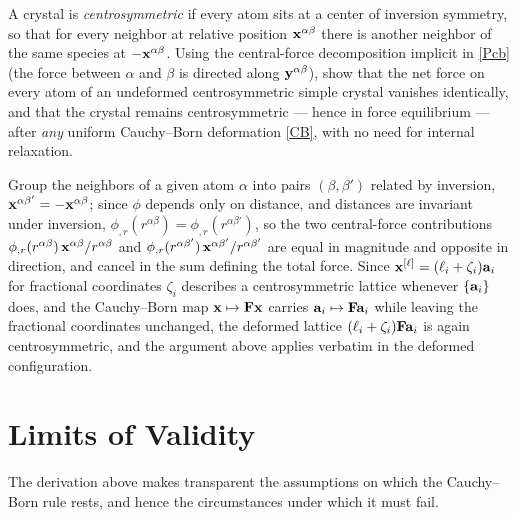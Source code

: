 \begin{exercise}\label{ex:centrosym}
	A crystal is \textit{centrosymmetric} if every atom sits at a center of inversion symmetry, so that for every neighbor at relative position $\mathbf{x}^{\alpha\beta}$ there is another neighbor of the same species at $-\mathbf{x}^{\alpha\beta}$. Using the central-force decomposition implicit in \eqref{Pcb} (the force between $\alpha$ and $\beta$ is directed along $\mathbf{y}^{\alpha\beta}$), show that the net force on every atom of an undeformed centrosymmetric simple crystal vanishes identically, and that the crystal remains centrosymmetric --- hence in force equilibrium --- after \textit{any} uniform Cauchy--Born deformation \eqref{CB}, with no need for internal relaxation.
	\begin{svolgimento}
		Group the neighbors of a given atom $\alpha$ into pairs $(\beta,\beta')$ related by inversion, $\mathbf{x}^{\alpha\beta'}=-\mathbf{x}^{\alpha\beta}$; since $\phi$ depends only on distance, and distances are invariant under inversion, $\phi_{,r}(r^{\alpha\beta}) = \phi_{,r}(r^{\alpha\beta'})$, so the two central-force contributions $\phi_{,r}(r^{\alpha\beta})\,\mathbf{x}^{\alpha\beta}/r^{\alpha\beta}$ and $\phi_{,r}(r^{\alpha\beta'})\,\mathbf{x}^{\alpha\beta'}/r^{\alpha\beta'}$ are equal in magnitude and opposite in direction, and cancel in the sum defining the total force. Since $\mathbf{x}^{[\ell]}=(\ell_i+\zeta_i)\mathbf{a}_i$ for fractional coordinates $\zeta_i$ describes a centrosymmetric lattice whenever $\{\mathbf{a}_i\}$ does, and the Cauchy--Born map $\mathbf{x}\mapsto\mathbf{F}\mathbf{x}$ carries $\mathbf{a}_i\mapsto\mathbf{F}\mathbf{a}_i$ while leaving the fractional coordinates unchanged, the deformed lattice $(\ell_i+\zeta_i)\mathbf{F}\mathbf{a}_i$ is again centrosymmetric, and the argument above applies verbatim in the deformed configuration.
	\end{svolgimento}
\end{exercise}

\section{Limits of Validity}\label{sec:CBlimits}

The derivation above makes transparent the assumptions on which the Cauchy--Born rule rests, and hence the circumstances under which it must fail.

